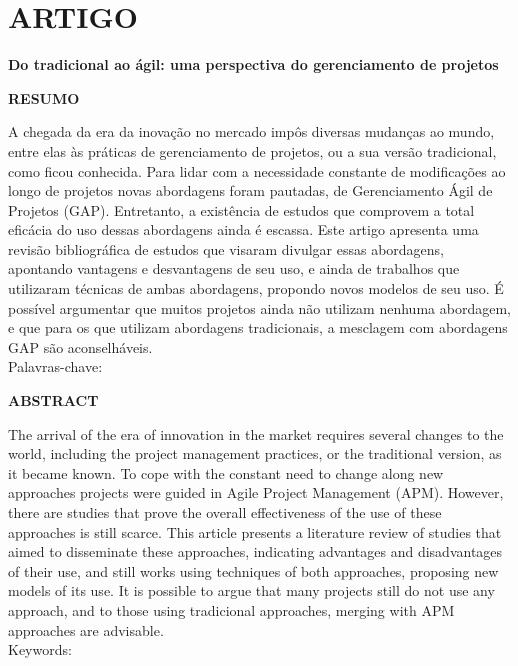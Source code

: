\anexo
\chapter{ARTIGO}

\begin{center}
{\large \textbf{Do tradicional ao ágil: uma perspectiva do gerenciamento de projetos}}
\end{center}

\begin{center}
\textbf{RESUMO}
\end{center}

\singlespacing
\noindent A chegada da era da inovação no mercado impôs diversas mudanças ao mundo, entre elas às práticas de gerenciamento de projetos, ou a sua versão tradicional, como ficou conhecida. Para lidar com a necessidade constante de modificações ao longo de projetos novas abordagens foram pautadas, de Gerenciamento Ágil de Projetos (GAP). Entretanto, a existência de estudos que comprovem a total eficácia do uso dessas abordagens ainda é escassa. Este artigo apresenta uma revisão bibliográfica de estudos que visaram divulgar essas abordagens, apontando vantagens e desvantagens de seu uso, e ainda de trabalhos que utilizaram técnicas de ambas abordagens, propondo novos modelos de seu uso. É possível argumentar que muitos projetos ainda não utilizam nenhuma abordagem, e que para os que utilizam abordagens tradicionais, a mesclagem com abordagens GAP são aconselháveis. \\
\noindent Palavras-chave:


\begin{center}
\textbf{ABSTRACT}
\end{center}

\singlespacing
\noindent The arrival of the era of innovation in the market requires several changes to the world, including the project management practices, or the traditional version, as it became known. To cope with the constant need to change along new approaches projects were guided in Agile Project Management (APM). However, there are studies that prove the overall effectiveness of the use of these approaches is still scarce. This article presents a literature review of studies that aimed to disseminate these approaches, indicating advantages and disadvantages of their use, and still works using techniques of both approaches, proposing new models of its use. It is possible to argue that many projects still do not use any approach, and to those using tradicional approaches, merging with APM approaches are advisable. \\
\noindent Keywords:


